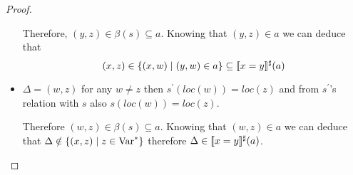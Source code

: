 \begin{proof}
\begin{itemize}
	Therefore, $(y,z)\in\beta(s)\subseteq a$. Knowing that $(y,z)\in a$ we can deduce that
	\begin{equation*}
		(x,z)\in \{(x,w)\mid (y,w) \in a \}\subseteq[\![x=y]\!]^\sharp(a)
	\end{equation*}
	\item $\Delta=(w,z)$ for any $w\ne z$ then $s^\prime(loc(w))=loc(z)$ and from $s^\prime$'s relation with $s$ also $s(loc(w))=loc(z)$.
	
	Therefore $(w,z)\in \beta(s)\subseteq a$. Knowing that $(w,z)\in a$ we can deduce that ${\Delta \notin \{(x,z) \mid z\in \text{Var}^*\}}$ therefore $\Delta \in [\![x=y]\!]^\sharp(a)$.
\end{itemize}
\end{proof}